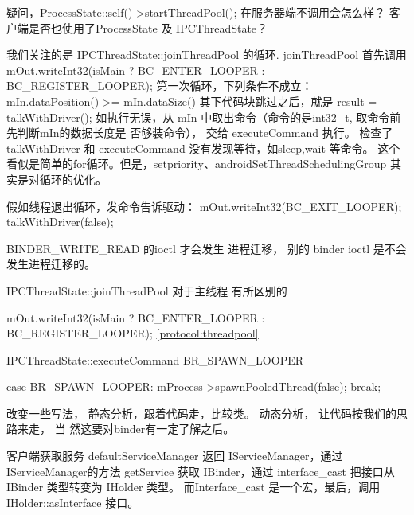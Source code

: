 \documentclass[a4paper,11pt]{article}
\begin{document}
疑问，ProcessState::self()->startThreadPool(); 在服务器端不调用会怎么样？
客户端是否也使用了ProcessState 及 IPCThreadState？

我们关注的是 IPCThreadState::joinThreadPool 的循环.
joinThreadPool 首先调用
mOut.writeInt32(isMain ? BC_ENTER_LOOPER : BC_REGISTER_LOOPER);
第一次循环，下列条件不成立：
mIn.dataPosition() >= mIn.dataSize()
其下代码块跳过之后，就是
 result = talkWithDriver();
如执行无误，从 mIn 中取出命令（命令的是int32_t, 取命令前先判断mIn的数据长度是
否够装命令）， 交给 executeCommand 执行。
检查了 talkWithDriver 和 executeCommand 没有发现等待，如sleep,wait 等命令。
这个看似是简单的for循环。但是，setpriority、androidSetThreadSchedulingGroup 其
实是对循环的优化。

假如线程退出循环，发命令告诉驱动：
    mOut.writeInt32(BC_EXIT_LOOPER);
    talkWithDriver(false);


BINDER_WRITE_READ 的ioctl
才会发生 进程迁移， 别的 binder ioctl 是不会发生进程迁移的。


IPCThreadState::joinThreadPool 对于主线程 有所区别的

 mOut.writeInt32(isMain ? BC_ENTER_LOOPER : BC_REGISTER_LOOPER);
\ref{protocol:threadpool}

IPCThreadState::executeCommand  BR_SPAWN_LOOPER 

case BR_SPAWN_LOOPER:
        mProcess->spawnPooledThread(false);
        break;

改变一些写法， 静态分析，跟着代码走，比较类。  动态分析， 让代码按我们的思路来走， 当
然这要对binder有一定了解之后。

客户端获取服务
defaultServiceManager  返回 IServiceManager，通过 IServiceManager的方法 getService 获取 IBinder，通过 interface_cast 把接口从 IBinder 类型转变为 IHolder 类型。
而Interface_cast 是一个宏，最后，调用 IHolder::asInterface 接口。
\end{document}
